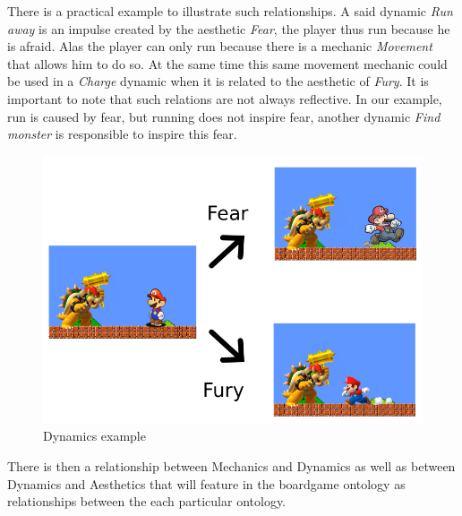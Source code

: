  There is a practical example to illustrate such relationships. A said dynamic \textit{Run away} is an impulse created by the aesthetic \textit{Fear}, the player thus run because he is afraid. Alas the player can only run because there is a mechanic \textit{Movement} that allows him to do so. At the same time this same movement mechanic could be used in a \textit{Charge} dynamic when it is related to the aesthetic of \textit{Fury}. It is important to note that such relations are not always reflective. In our example, run is caused by fear, but running does not inspire fear, another dynamic \textit{Find monster} is responsible to inspire this fear.
 
 \begin{figure}[h!]
     \centering 
     \includegraphics[scale = 0.55]{Images/MarioDiagram.png}
     \caption{Dynamics example}
     \label{fig:dynamicexample}
 \end{figure}

There is then a relationship between Mechanics and Dynamics as well as between Dynamics and Aesthetics that will feature in the boardgame ontology as relationships between the each particular ontology.
